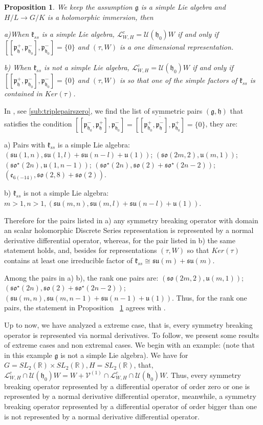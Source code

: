 \documentclass[12pt]{amsart}
\newtheorem{prop}[thm]{Proposition}
\theoremstyle{definition}
\theoremstyle{remark}
\newcommand{\g}{\mathfrak{g}}
\newcommand{\h}{\mathfrak{h}}
\renewcommand{\k}{{\mathfrak k}}
\newcommand{\p}{\mathfrak p}
\newcommand{\R}{{\mathbb R}}
\numberwithin{equation}{section}
\begin{document}
\begin{prop}\label{prop:allsbarenormal} We keep the assumption $\g$ is a simple Lie algebra and $H/L\rightarrow G/K$ is a holomorphic immersion, then

a)When $ \k_{ss}$ is a simple Lie algebra,   $\mathcal L_{W,H}^c = \mathcal U(\mathfrak h_0)W$ if and only if $[[\p_\h^+,\p_{\h_0}^-],\p_{\h_0}^-]=\{0\}$ and $(\tau, W)$ is a one dimensional representation.

b) When $ \k_{ss}$ is not a simple Lie algebra,   $\mathcal L_{W,H}^c = \mathcal U(\mathfrak h_0)W$ if and only if $[[\p_\h^+,\p_{\h_0}^-],\p_{\h_0}^-]=\{0\}$ and $(\tau, W)$ is so that one of the simple factors of  $ \k_{ss}$ is contained in $Ker(\tau)$.
\end{prop}
  In \cite[4.6]{Va}, see \ref{sub:triplepairszero},  we find the list of symmetric   pairs $(\g,\h)$ that satisfies the condition $[[ \p_{\h_0}^-,\p_\h^+ ],\p_{\h_0}^-]=\overline{[[ \p_{\h_0}^+, \p_\h^- ],
\p_{\h_0}^+]}=\{0\}$, they  are:


  a) Pairs with $ \k_{ss}$ is   a simple Lie algebra: $ (\mathfrak{su}(1,n), \mathfrak{su} (1,l) +\mathfrak{su} ( n-l)+\mathfrak u(1)) $; $(\mathfrak{so}(2m,2), \mathfrak u(m,1)) $;   $(\mathfrak{so}^\star (2n), \mathfrak u(1,n-1)) $; $(\mathfrak{so}^\star(2n),  \mathfrak{so}(2) +\mathfrak{so}^\star(2n-2)) $;
$(\mathfrak e_{6(-14)}, \mathfrak{so}(2,8)+\mathfrak{so}(2)).$

b) $ \k_{ss}$ is not a simple Lie algebra: $ m>1,n>1, (\mathfrak{su}(m,n), \mathfrak{su} (m,l) +\mathfrak{su} ( n-l)+\mathfrak u(1)).$


Therefore for the pairs listed in a) any symmetry breaking operator with domain an scalar holomorphic Discrete Series representation is represented by a normal derivative differential operator, whereas, for the pair listed in b) the same statement holds, and, besides  for representations   $(\tau, W)$ so that $Ker(\tau)$ contains at least one irreducible factor of $\k_{ss}\cong \mathfrak{su}(m)+\mathfrak{su}(m)$.

Among the pairs in a) b), the rank one pairs are:  $(\mathfrak{so}(2m,2), \mathfrak u(m,1)) $;  $(\mathfrak{so}^\star(2n),  \mathfrak{so}(2) +\mathfrak{so}^\star(2n-2)) $; $   (\mathfrak{su}(m,n), \mathfrak{su} (m,n-1) +\mathfrak{su} ( n-1)+\mathfrak u(1)).$ Thus, for the rank one pairs, the statement in Proposition~ \ref{prop:allsbarenormal} agrees with \cite[Theorem 5.3]{KP2}.

Up to now, we have analyzed a extreme case, that is, every symmetry breaking operator is represented via normal derivatives. To follow, we present some results of extreme cases and non extremal cases.  We begin with an example: (note that in this  example $\g$ is not a simple Lie algebra).  We have for
  $G=SL_2(\R)\times SL_2(\R), H=SL_2(\R)$, that, $\mathcal L_{W,H}^c \cap \mathcal U(\h_0)W =W+\mathcal V^{(1)}\cap \mathcal L_{W,H}^c \cap \mathcal U(\h_0)W $.
Thus, every symmetry breaking operator represented by a differential operator of order
  zero or one is represented by a normal derivative differential operator, meanwhile, a symmetry breaking operator represented by a differential operator of order bigger than one is not represented  by a normal derivative differential operator.
\end{document}
